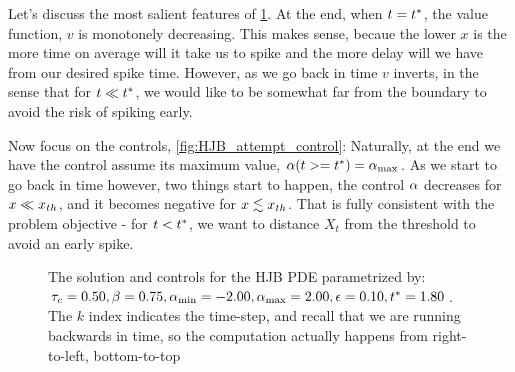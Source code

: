 \documentclass{article}
\begin{document}

Let's discuss the most salient features of \cref{fig:HJB_attempt}. At the end,
when $t = { t^* }$, the value function, $v$ is monotonely decreasing. This makes
sense, becaue the lower $x$ is the more time on average will it take us to spike
and the more delay will we have from our desired spike time. However, as we go
back in time $v$ inverts, in the sense that for $t \ll { t^* }$, we would like to
be somewhat far from the boundary to avoid the risk of spiking early.

Now focus on the controls, \cref{fig:HJB_attempt_control}: Naturally, at the
end we have the control assume its maximum value, ${\alpha}(t>={ t^* }) = { {\alpha}_{\textrm{max}} }$. As we
start to go back in time however, two things start to happen, the control ${\alpha}$
decreases for $x \ll { x_{th} }$, and it becomes negative for $x \lesssim { x_{th} }$. 
That is fully consistent with the problem objective - for
$t<{ t^* }$, we want to distance $X_t$ from the threshold to avoid an early spike.
\begin{figure}[h!]
\begin{center}
\caption[]{The solution and controls for the HJB PDE parametrized by:
${ \tau_{c} } = 0.50,  \beta = 0.75,
{ {\alpha}_{\textrm{min}} } = -2.00, { {\alpha}_{\textrm{max}} } = 2.00, {\epsilon}=0.10,
{ t^* } = 1.80$. The $k$ index indicates the time-step, and recall that we are
running backwards in time, so the computation actually happens from right-to-left, bottom-to-top}
\label{fig:HJB_attempt}
\end{center}
\end{figure}
\end{document}
